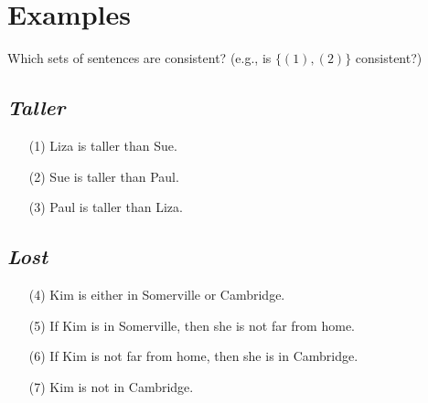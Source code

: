 \documentclass[a4paper, 11pt]{article} %
\newcommand{\set}[1]{\lbrace#1\rbrace} %
\begin{document}
\section*{Examples}

\noindent
Which sets of sentences are consistent? (e.g., is $\set{(1),(2)}$ consistent?)

\subsection*{\it \textbf{Taller}}

\begin{enumerate}
  \item[(1)] Liza is taller than Sue.
  \item[(2)] Sue is taller than Paul.
  \item[(3)] Paul is taller than Liza.
\end{enumerate}




\subsection*{\it \textbf{Lost}}

\begin{enumerate}
  \item[(4)] Kim is either in Somerville or Cambridge.
  \item[(5)] If Kim is in Somerville, then she is not far from home.
  \item[(6)] If Kim is not far from home, then she is in Cambridge.
  \item[(7)] Kim is not in Cambridge.
\end{enumerate}







%
\end{document}
